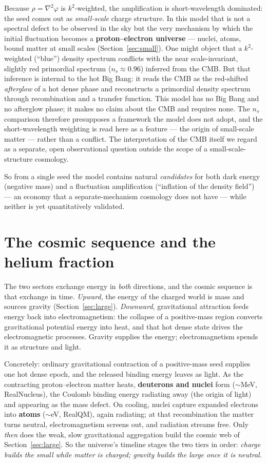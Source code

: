 \documentclass[11pt]{article}
\newcommand{\grad}{\nabla}
\begin{document}
Because $\rho=\grad^2\varphi$ is $k^2$-weighted, the amplification is short-wavelength dominated: the seed comes
out as \emph{small-scale} charge structure. In this model that is not a spectral defect to be observed in the sky
but the very mechanism by which the initial fluctuation becomes a \textbf{proton--electron universe} --- nuclei,
atoms, bound matter at small scales (Section~\ref{sec:small}). One might object that a $k^2$-weighted (``blue'')
density spectrum conflicts with the near scale-invariant, slightly red primordial spectrum ($n_s\approx0.96$)
inferred from the CMB. But that inference is internal to the hot Big Bang: it reads the CMB as the red-shifted
\emph{afterglow} of a hot dense phase and reconstructs a primordial density spectrum through recombination and a
transfer function. This model has no Big Bang and no afterglow phase; it makes no claim about the CMB and requires
none. The $n_s$ comparison therefore presupposes a framework the model does not adopt, and the short-wavelength
weighting is read here as a feature --- the origin of small-scale matter --- rather than a conflict. The
interpretation of the CMB itself we regard as a separate, open observational question outside the scope of a
small-scale-structure cosmology.

So from a single seed the model contains natural \emph{candidates} for both dark energy (negative mass) and a
fluctuation amplification (``inflation of the density field'') --- an economy that a separate-mechanism cosmology
does not have --- while neither is yet quantitatively validated.

\section{The cosmic sequence and the helium fraction}\label{sec:sequence}
The two sectors exchange energy in \emph{both} directions, and the cosmic sequence is that exchange in time.
\emph{Upward}, the energy of the charged world is mass and sources gravity (Section~\ref{sec:large}).
\emph{Downward}, gravitational attraction feeds energy back into electromagnetism: the collapse of a positive-mass
region converts gravitational potential energy into heat, and that hot dense state drives the electromagnetic
processes. Gravity supplies the energy; electromagnetism spends it as structure and light.

Concretely: ordinary gravitational contraction of a positive-mass seed supplies one hot dense epoch, and the
released binding energy leaves as light. As the contracting proton--electron matter heats, \textbf{deuterons and nuclei} form
(${\sim}$MeV, RealNucleus), the Coulomb binding energy radiating away (the origin of light) and appearing as the
mass defect. On cooling, nuclei capture expanded electrons into \textbf{atoms} (${\sim}$eV, RealQM), again
radiating; at that recombination the matter turns neutral, electromagnetism screens out, and radiation streams
free. Only \emph{then} does the weak, slow gravitational aggregation build the cosmic web of
Section~\ref{sec:large}. So the universe's timeline stages the two tiers in order: \emph{charge builds the small
while matter is charged; gravity builds the large once it is neutral}.
\end{document}
